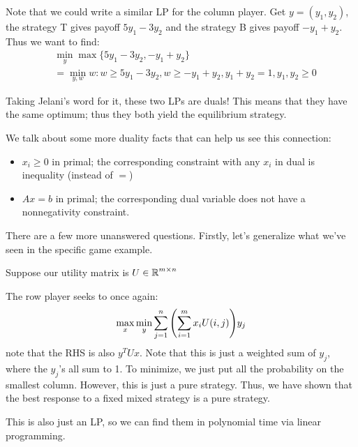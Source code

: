 \begin{example}
    Note that we could write a similar LP for the column player. Get $y = (y_1, y_2)$, the strategy T gives payoff $5y_1 - 3y_2$ and
    the strategy B gives payoff $-y_1 + y_2$. Thus we want to find:
    \begin{align*}
        &\min_y \max\{5y_1 - 3y_2, -y_1 + y_2\} \\
        &= \min_{y, w} w: w \geq 5y_1 - 3y_2, w \geq -y_1 + y_2, y_1 + y_2 = 1, y_1, y_2 \geq 0
    \end{align*}

    Taking Jelani's word for it, these two LPs are duals! This means that they have the same optimum; thus they both yield the equilibrium strategy.
\end{example}

We talk about some more duality facts that can help us see this connection:
\begin{itemize}
    \item $x_i \geq 0$ in primal; the corresponding constraint with any $x_i$ in dual is inequality (instead of $=$)
    \item $Ax = b$ in primal; the corresponding dual variable does not have a nonnegativity constraint.
\end{itemize}

There are a few more unanswered questions. Firstly, let's generalize what we've seen in the specific game example.

\begin{theorem}
    Suppose our utility matrix is $U \in \operatorname{\mathbb{R}}^{m \times n}$

    The row player seeks to once again:
    \[ \max_x \min_y \sum_{j = 1}^n\qty(\sum_{i = 1}^m x_i U(i, j)) y_j \]
    note that the RHS is also $y^T U x$. Note that this is just a weighted sum of $y_j$, where the $y_j$'s all sum to 1. To minimize,
    we just put all the probability on the smallest column. However, this is just a pure strategy. Thus, we have shown that the best response to
    a fixed mixed strategy is a pure strategy.

    This is also just an LP, so we can find them in polynomial time via linear programming.
\end{theorem}
